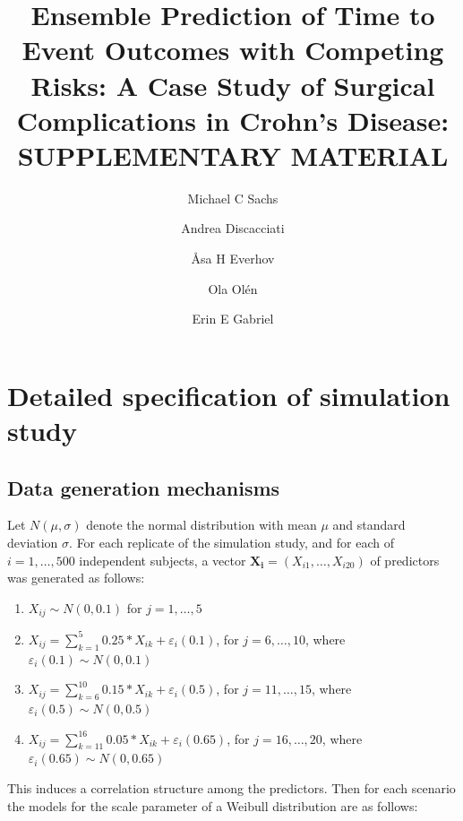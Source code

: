 \documentclass{statsoc}
\title[Ensemble Prediction for CD]{Ensemble Prediction of Time to Event Outcomes with Competing Risks: A Case Study of Surgical Complications in Crohn's Disease: SUPPLEMENTARY MATERIAL}
\author{Michael C Sachs}
\author{Andrea Discacciati}
\author{Åsa H Everhov}
\author{Ola Olén}
\author[Michael C Sachs {\it et al.}]{Erin E Gabriel}
\begin{document}
  

\section{Detailed specification of simulation study}

\subsection{Data generation mechanisms}

Let $N(\mu, \sigma)$ denote the normal distribution with mean $\mu$ and standard deviation $\sigma$. For each replicate of the simulation study, and for each of $i = 1, \ldots, 500$ independent subjects, a vector $\mathbf{X_i} = (X_{i1}, \ldots, X_{i20})$ of predictors was generated as follows: 

\begin{enumerate}
\item $X_{ij} \sim N(0, 0.1)$ for $j = 1, \ldots, 5$
\item $X_{ij} = \sum_{k = 1}^5 0.25 * X_{ik} + \varepsilon_{i}(0.1)$, for $j = 6, \ldots, 10$, where $\varepsilon_{i}(0.1) \sim N(0, 0.1)$
\item $X_{ij} = \sum_{k = 6}^{10} 0.15 * X_{ik} + \varepsilon_{i}(0.5)$, for $j = 11, \ldots, 15$, where $\varepsilon_{i}(0.5) \sim N(0, 0.5)$
\item $X_{ij} = \sum_{k = 11}^{16} 0.05 * X_{ik} + \varepsilon_{i}(0.65)$, for $j = 16, \ldots, 20$, where $\varepsilon_{i}(0.65) \sim N(0, 0.65)$
\end{enumerate}

This induces a correlation structure among the predictors. Then for each scenario the models for the scale parameter of a Weibull distribution are as follows: 
\end{document}
